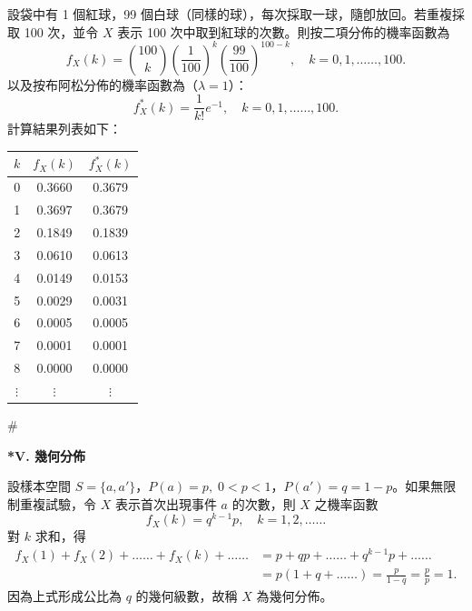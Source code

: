 \medskip
\begin{example}[*]\label{ex:b5s-5-7}
設袋中有 1 個紅球，99 個白球（同樣的球），每次採取一球，隨卽放回。若重複採取 100 次，並令 $X$ 表示 100 次中取到紅球的次數。則按二項分佈的機率函數為
\[
f_X(k) = \binom{100}{k} \left(\frac{1}{100}\right)^k \left(\frac{99}{100}\right)^{100-k}, \quad k = 0, 1, \dots\dots, 100.
\]
以及按布阿松分佈的機率函數為（$\lambda = 1$）：
\[
f_X^*(k) = \frac{1}{k!} e^{-1}, \quad k = 0, 1, \dots\dots, 100.
\]
計算結果列表如下：

\begin{center}
\renewcommand{\arraystretch}{1.2}
\begin{tabular}{c|c|c}
\hline\hline
$k$ & $f_X(k)$ & $f_X^*(k)$\footnotemark \\
\hline
0 & 0.3660 & 0.3679 \\
1 & 0.3697 & 0.3679 \\
2 & 0.1849 & 0.1839 \\
3 & 0.0610 & 0.0613 \\
4 & 0.0149 & 0.0153 \\
5 & 0.0029 & 0.0031 \\
6 & 0.0005 & 0.0005 \\
7 & 0.0001 & 0.0001 \\
8 & 0.0000 & 0.0000 \\
$\vdots$ & $\vdots$ & $\vdots$ \\
\hline\hline
\end{tabular}
\end{center}
\label{note:b5s-ch5-p150-fxstar}
\end{example}
\hfill $\#$

\medskip
\noindent\textbf{*V. 幾何分佈}

設樣本空間 $S = \{a, a'\}$，$P(a) = p, \; 0 < p < 1$，$P(a') = q = 1 - p$。如果無限制重複試驗，令 $X$ 表示首次出現事件 $a$ 的次數，則 $X$ 之機率函數
\begin{equation}
f_X(k) = q^{k-1} p, \quad k = 1, 2, \dots\dots \label{eq:b5s-ch5-4}
\end{equation}
對 $k$ 求和，得
\begin{align*}
f_X(1) + f_X(2) + \dots\dots + f_X(k) + \dots\dots &= p + qp + \dots\dots + q^{k-1} p + \dots\dots \\
&= p(1 + q + \dots\dots) = \frac{p}{1 - q} = \frac{p}{p} = 1.
\end{align*}
因為上式形成公比為 $q$ 的幾何級數，故稱 $X$ 為幾何分佈。

